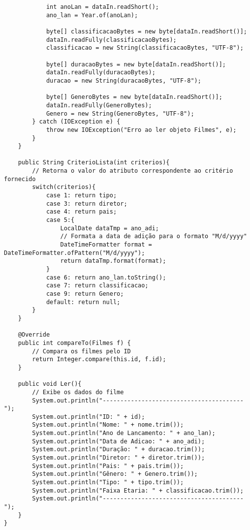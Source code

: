\documentclass[12pt]{article}
\begin{document}
\begin{lstlisting}
            int anoLan = dataIn.readShort();
            ano_lan = Year.of(anoLan);
            
            byte[] classificacaoBytes = new byte[dataIn.readShort()];
            dataIn.readFully(classificacaoBytes);
            classificacao = new String(classificacaoBytes, "UTF-8");
            
            byte[] duracaoBytes = new byte[dataIn.readShort()];
            dataIn.readFully(duracaoBytes);
            duracao = new String(duracaoBytes, "UTF-8");
            
            byte[] GeneroBytes = new byte[dataIn.readShort()];
            dataIn.readFully(GeneroBytes);
            Genero = new String(GeneroBytes, "UTF-8");
        } catch (IOException e) {
            throw new IOException("Erro ao ler objeto Filmes", e);
        }
    }

    public String CriterioLista(int criterios){
        // Retorna o valor do atributo correspondente ao critério fornecido
        switch(criterios){
            case 1: return tipo;
            case 3: return diretor;
            case 4: return pais;
            case 5:{
                LocalDate dataTmp = ano_adi;
                // Formata a data de adição para o formato "M/d/yyyy"
                DateTimeFormatter format = DateTimeFormatter.ofPattern("M/d/yyyy");
                return dataTmp.format(format);
            }
            case 6: return ano_lan.toString();
            case 7: return classificacao;
            case 9: return Genero;
            default: return null;
        }
    }
    
    @Override
    public int compareTo(Filmes f) {
        // Compara os filmes pelo ID
        return Integer.compare(this.id, f.id);
    }
    
    public void Ler(){
        // Exibe os dados do filme
        System.out.println("----------------------------------------");
        System.out.println("ID: " + id);
        System.out.println("Nome: " + nome.trim());
        System.out.println("Ano de Lancamento: " + ano_lan);
        System.out.println("Data de Adicao: " + ano_adi);
        System.out.println("Duração: " + duracao.trim());
        System.out.println("Diretor: " + diretor.trim());
        System.out.println("Pais: " + pais.trim());
        System.out.println("Gênero: " + Genero.trim());
        System.out.println("Tipo: " + tipo.trim());
        System.out.println("Faixa Etaria: " + classificacao.trim());
        System.out.println("----------------------------------------");
    }
}

\end{lstlisting}
\end{document}

